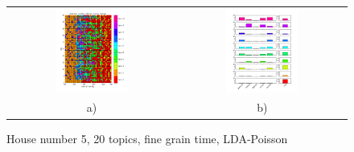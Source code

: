 \begin{figure}[h!]
 \centering
 \begin{tabular}{c c}
  \includegraphics[width=0.45\textwidth]{Pictures/Pois/fine/DayHN5TS48k20fine.png}
  &
  \includegraphics[width=0.45\textwidth]{Pictures/Pois/fine/TopHN5TS48k20fine.png}\\
  a) & b)
 \end{tabular}
  \caption{House number 5, 20 topics, fine grain time, LDA-Poisson}
\end{figure}